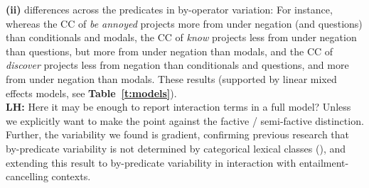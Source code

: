 \documentclass[12pt, a4paper]{article}
\begin{document}
	\noindent \textbf{(ii)} differences across the predicates in by-operator variation: For instance, whereas the CC of \emph{be annoyed} projects more from under negation (and questions) than conditionals and modals, the CC of \emph{know} projects less from under negation than questions, but more from under negation than modals, and the CC of \emph{discover} projects less from negation than conditionals and questions, and more from under negation than modals. These results (supported by linear mixed effects models, see \textbf{Table~\ref{t:models}}).\\

	\noindent
	{\bfseries LH: } Here it may be enough to report interaction terms in a full model? Unless we explicitly want to make the point against the factive / semi-factive distinction.\\

	\noindent Further, the variability we found is gradient, confirming previous research that by-predicate variability is not determined by categorical lexical classes (\citealt{tonhauser_how_2018,degen_are_2022}), and extending this result to by-predicate variability in interaction with entailment-cancelling contexts.\\
	

\end{document}
